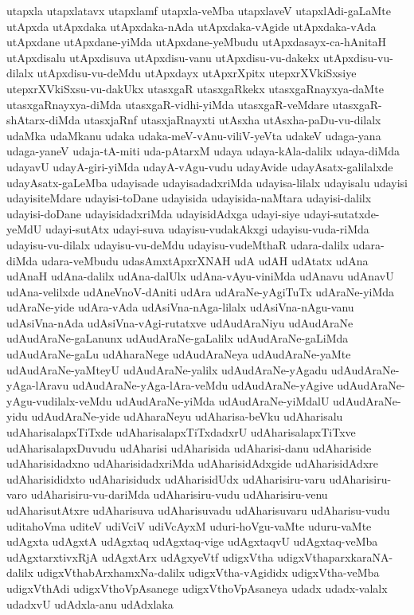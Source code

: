 {utapxla
utapxlatavx
utapxlamf
utapxla-veMba
utapxlaveV
utapxlAdi-gaLaMte
utApxda
utApxdaka
utApxdaka-nAda
utApxdaka-vAgide
utApxdaka-vAda
utApxdane
utApxdane-yiMda
utApxdane-yeMbudu
utApxdasayx-ca-hAnitaH
utApxdisalu
utApxdisuva
utApxdisu-vanu
utApxdisu-vu-dakekx
utApxdisu-vu-dilalx
utApxdisu-vu-deMdu
utApxdayx
utApxrXpitx
utepxrXVkiSxsiye
utepxrXVkiSxsu-vu-dakUkx
utasxgaR
utasxgaRkekx
utasxgaRnayxya-daMte
utasxgaRnayxya-diMda
utasxgaR-vidhi-yiMda
utasxgaR-veMdare
utasxgaR-shAtarx-diMda
utasxjaRnf
utasxjaRnayxti
utAsxha
utAsxha-paDu-vu-dilalx
udaMka
udaMkanu
udaka
udaka-meV-vAnu-viliV-yeVta
udakeV
udaga-yana
udaga-yaneV
udaja-tA-miti
uda-pAtarxM
udaya
udaya-kAla-dalilx
udaya-diMda
udayavU
udayA-giri-yiMda
udayA-vAgu-vudu
udayAvide
udayAsatx-galilalxde
udayAsatx-gaLeMba
udayisade
udayisadadxriMda
udayisa-lilalx
udayisalu
udayisi
udayisiteMdare
udayisi-toDane
udayisida
udayisida-naMtara
udayisi-dalilx
udayisi-doDane
udayisidadxriMda
udayisidAdxga
udayi-siye
udayi-sutatxde-yeMdU
udayi-sutAtx
udayi-suva
udayisu-vudakAkxgi
udayisu-vuda-riMda
udayisu-vu-dilalx
udayisu-vu-deMdu
udayisu-vudeMthaR
udara-dalilx
udara-diMda
udara-veMbudu
udasAmxtApxrXNAH
udA
udAH
udAtatx
udAna
udAnaH
udAna-dalilx
udAna-dalUlx
udAna-vAyu-viniMda
udAnavu
udAnavU
udAna-velilxde
udAneVnoV-dAniti
udAra
udAraNe-yAgiTuTx
udAraNe-yiMda
udAraNe-yide
udAra-vAda
udAsiVna-nAga-lilalx
udAsiVna-nAgu-vanu
udAsiVna-nAda
udAsiVna-vAgi-rutatxve
udAudAraNiyu
udAudAraNe
udAudAraNe-gaLanunx
udAudAraNe-gaLalilx
udAudAraNe-gaLiMda
udAudAraNe-gaLu
udAharaNege
udAudAraNeya
udAudAraNe-yaMte
udAudAraNe-yaMteyU
udAudAraNe-yalilx
udAudAraNe-yAgadu
udAudAraNe-yAga-lAravu
udAudAraNe-yAga-lAra-veMdu
udAudAraNe-yAgive
udAudAraNe-yAgu-vudilalx-veMdu
udAudAraNe-yiMda
udAudAraNe-yiMdalU
udAudAraNe-yidu
udAudAraNe-yide
udAharaNeyu
udAharisa-beVku
udAharisalu
udAharisalapxTiTxde
udAharisalapxTiTxdadxrU
udAharisalapxTiTxve
udAharisalapxDuvudu
udAharisi
udAharisida
udAharisi-danu
udAhariside
udAharisidadxno
udAharisidadxriMda
udAharisidAdxgide
udAharisidAdxre
udAharisididxto
udAharisidudx
udAharisidUdx
udAharisiru-varu
udAharisiru-varo
udAharisiru-vu-dariMda
udAharisiru-vudu
udAharisiru-venu
udAharisutAtxre
udAharisuva
udAharisuvadu
udAharisuvaru
udAharisu-vudu
uditahoVma
uditeV
udiVciV
udiVcAyxM
uduri-hoVgu-vaMte
uduru-vaMte
udAgxta
udAgxtA
udAgxtaq
udAgxtaq-vige
udAgxtaqvU
udAgxtaq-veMba
udAgxtarxtivxRjA
udAgxtArx
udAgxyeVtf
udigxVtha
udigxVthaparxkaraNA-dalilx
udigxVthabArxhamxNa-dalilx
udigxVtha-vAgididx
udigxVtha-veMba
udigxVthAdi
udigxVthoVpAsanege
udigxVthoVpAsaneya
udadx
udadx-valalx
udadxvU
udAdxla-anu
udAdxlaka
}

